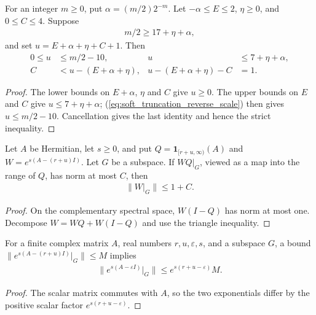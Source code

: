 \begin{lemma}
    \label{thm:soft_truncation_reverse_cutoff}
    \leanok
    For an integer $m\ge0$, put $\alpha=(m/2)2^{-m}$. Let
    $-\alpha\le E\le2$, $\eta\ge0$, and $0\le C\le4$. Suppose
    \begin{align}
        m/2\ge17+\eta+\alpha,
        \label{eq:soft_truncation_reverse_scale}
    \end{align}
    and set $u=E+\alpha+\eta+C+1$. Then
    \begin{align*}
        0\le u              & \le m/2-10,         & u & \le7+\eta+\alpha, \\
        C                   & <u-(E+\alpha+\eta), &
        u-(E+\alpha+\eta)-C & =1.
    \end{align*}
\end{lemma}
\begin{proof}\leanok
    The lower bounds on $E+\alpha$, $\eta$ and $C$ give $u\ge0$.
    The upper bounds on $E$ and $C$ give $u\le7+\eta+\alpha$;
    (\ref{eq:soft_truncation_reverse_scale}) then gives $u\le m/2-10$.
    Cancellation gives the last identity and hence the strict inequality.
\end{proof}

\begin{lemma}
    \label{lem:exponential_weight_high_restriction}
    \leanok
    Let $A$ be Hermitian, let $s\ge0$, and put
    $Q=\mathbf1_{[r+u,\infty)}(A)$ and $W=e^{s(A-(r+u)I)}$.
    Let $G$ be a subspace. If $WQ|_G$, viewed as a map into the range of
    $Q$, has norm at most $C$, then
    \begin{align*}
        \|W|_G\|\le1+C.
    \end{align*}
\end{lemma}
\begin{proof}\leanok
    On the complementary spectral space, $W(I-Q)$ has norm at most one.
    Decompose $W=WQ+W(I-Q)$ and use the triangle inequality.
\end{proof}

\begin{lemma}
    \label{lem:shifted_exponential_weight_restriction}
    \leanok
    For a finite complex matrix $A$, real numbers $r,u,\varepsilon,s$,
    and a subspace $G$, a bound
    $\|e^{s(A-(r+u)I)}|_G\|\le M$ implies
    \begin{align*}
        \|e^{s(A-\varepsilon I)}|_G\|
        \le e^{s(r+u-\varepsilon)}M.
    \end{align*}
\end{lemma}
\begin{proof}\leanok
    The scalar matrix commutes with $A$, so the two exponentials differ by
    the positive scalar factor $e^{s(r+u-\varepsilon)}$.
\end{proof}

